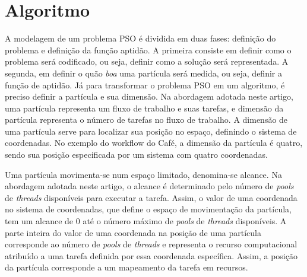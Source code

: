 \section{Algoritmo}
\label{sec:algoritmo}
A modelagem de um problema PSO é dividida em duas fases: definição do problema e definição da função aptidão. A primeira consiste em definir como o problema será codificado, ou seja, definir como a solução será representada. A segunda, em definir o quão \textit{boa} uma partícula será medida, ou seja, definir a função de aptidão.
Já para transformar o problema PSO em um algoritmo, é preciso definir a partícula e sua dimensão. Na abordagem adotada neste artigo, uma partícula representa um fluxo de trabalho e suas tarefas, e dimensão da partícula representa o número de tarefas no fluxo de trabalho. A dimensão de uma partícula serve para localizar sua posição no espaço, definindo o sistema de coordenadas. No exemplo do workflow do Café, a dimensão da partícula é quatro, sendo sua posição especificada por um sistema com quatro coordenadas.

Uma partícula movimenta-se num espaço limitado, denomina-se alcance. Na abordagem adotada neste artigo, o alcance é determinado pelo número de \emph{pools} de \emph{threads} disponíveis para executar a tarefa. Assim, o valor de uma coordenada no sistema de coordenadas, que define o espaço de movimentação da partícula, tem um alcance de 0 até o número máximo de \emph{pools} de \emph{threads} disponíveis. A parte inteira do valor de uma coordenada na posição de uma partícula corresponde ao número de \emph{pools} de \emph{threads} e representa o recurso computacional atribuído a uma tarefa definida por essa coordenada específica. Assim, a posição da partícula corresponde a um mapeamento da tarefa em recursos. 

